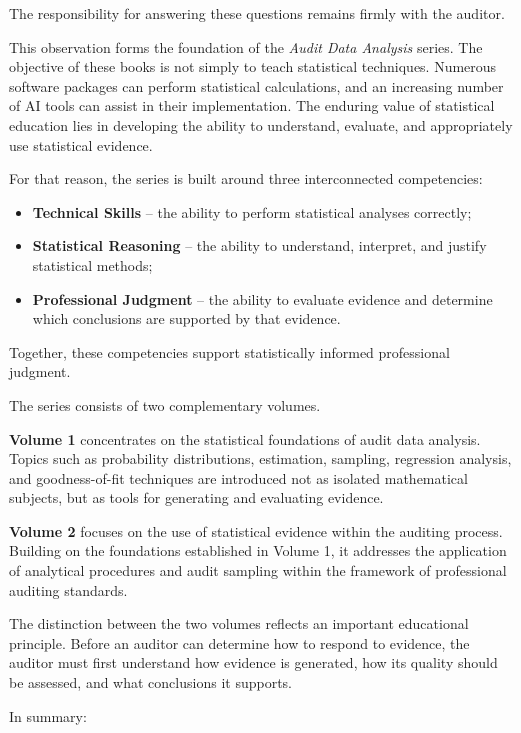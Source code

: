 The responsibility for answering these questions remains firmly with the auditor.

\bigskip
This observation forms the foundation of the \emph{Audit Data Analysis} series.
The objective of these books is not simply to teach statistical techniques. Numerous software packages can perform statistical calculations, and an increasing number of AI tools can assist in their implementation. The enduring value of statistical education lies in developing the ability to understand, evaluate, and appropriately use statistical evidence.

\bigskip
For that reason, the series is built around three interconnected competencies:

\begin{itemize}
\item \textbf{Technical Skills} – the ability to perform statistical analyses correctly;
\item \textbf{Statistical Reasoning} – the ability to understand, interpret, and justify statistical methods;
\item \textbf{Professional Judgment} – the ability to evaluate evidence and determine which conclusions are supported by that evidence.
\end{itemize}

Together, these competencies support statistically informed professional judgment.

\bigskip
The series consists of two complementary volumes.

\textbf{Volume 1} concentrates on the statistical foundations of audit data analysis. Topics such as probability distributions, estimation, sampling, regression analysis, and goodness-of-fit techniques are introduced not as isolated mathematical subjects, but as tools for generating and evaluating evidence.

\textbf{Volume 2} focuses on the use of statistical evidence within the auditing process. Building on the foundations established in Volume 1, it addresses the application of analytical procedures and audit sampling within the framework of professional auditing standards.

The distinction between the two volumes reflects an important educational principle.
Before an auditor can determine how to respond to evidence, the auditor must first understand how evidence is generated, how its quality should be assessed, and what conclusions it supports.

In summary:

